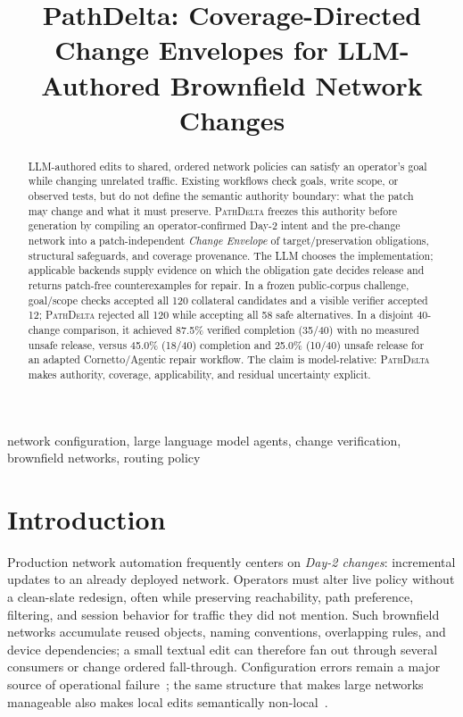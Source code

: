 \documentclass[conference]{IEEEtran}
\newcommand{\system}{\textsc{PathDelta}\xspace}
\begin{document}
\title{PathDelta: Coverage-Directed Change Envelopes for LLM-Authored Brownfield Network Changes}

\author{
}

\maketitle

\begin{abstract}
LLM-authored edits to shared, ordered network policies can satisfy an operator's
goal while changing unrelated traffic.  Existing workflows check goals, write
scope, or observed tests, but do not define the semantic authority boundary:
what the patch may change and what it must preserve.  \system freezes this
authority before generation by compiling an operator-confirmed Day-2 intent and
the pre-change network into a patch-independent \emph{Change Envelope} of
target/preservation obligations, structural safeguards, and coverage provenance.
The LLM chooses the implementation; applicable backends supply evidence on
which the obligation gate decides release and returns patch-free
counterexamples for repair.  In a frozen public-corpus challenge, goal/scope
checks accepted all 120 collateral candidates and a visible verifier accepted
12; \system rejected all 120 while accepting all 58 safe alternatives.  In a disjoint 40-change
comparison, it achieved 87.5\% verified completion (35/40) with no measured
unsafe release, versus 45.0\% (18/40) completion and 25.0\% (10/40) unsafe
release for an adapted Cornetto/Agentic repair workflow.  The claim is
model-relative: \system makes authority, coverage, applicability, and residual
uncertainty explicit.
\end{abstract}

\begin{IEEEkeywords}
network configuration, large language model agents, change verification,
brownfield networks, routing policy
\end{IEEEkeywords}

\section{Introduction}

Production network automation frequently centers on \emph{Day-2 changes}: incremental updates
to an already deployed network.  Operators must alter live policy without a
clean-slate redesign, often while preserving reachability, path preference,
filtering, and session behavior for traffic they did not mention.  Such
brownfield networks accumulate reused objects, naming conventions, overlapping
rules, and device dependencies; a small textual edit can therefore fan out
through several consumers or change ordered fall-through.  Configuration errors
remain a major source of operational failure~\cite{oppenheimer2003internet,
yin2011empirical}; the same structure that makes large networks manageable also
makes local edits semantically non-local~\cite{benson2009complexity}.
\end{document}
